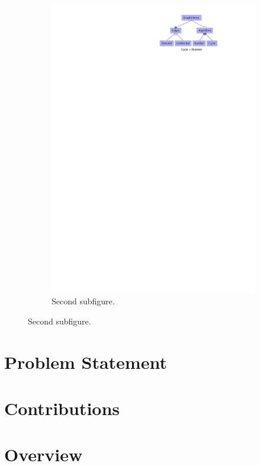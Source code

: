 \begin{figure}
\begin{subfigure}{0.33\linewidth}
      \includegraphics[width=\linewidth]{img/example.pdf}
      \caption{Second subfigure.}
      \label{fig:second}
   \end{subfigure}
\end{figure}

\section{Problem Statement}

\section{Contributions}

\section{Overview}